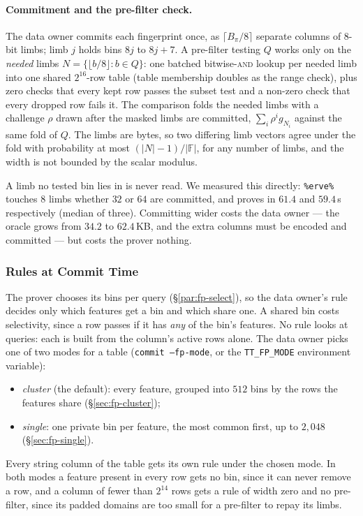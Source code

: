 \paragraph{Commitment and the pre-filter check.}
The data owner commits each fingerprint once, as $\lceil B_\pi / 8
\rceil$ separate columns of $8$-bit limbs; limb $j$ holds bins $8j$ to
$8j + 7$. A pre-filter testing $Q$ works only on the \emph{needed} limbs
$N = \{ \lfloor b/8 \rfloor : b \in Q \}$: one batched
bitwise-\textsc{and} lookup per needed limb into one shared $2^{16}$-row
table (table membership doubles as the range check), plus zero checks
that every kept row passes the subset test and a non-zero check that
every dropped row fails it. The comparison folds the needed limbs with a
challenge $\rho$ drawn after the masked limbs are committed,
$\sum_i \rho^i g_{N_i}$ against the same fold of $Q$. The limbs are
bytes, so two differing limb vectors agree under the fold with
probability at most $(|N| - 1)/|\mathbb{F}|$, for any number of limbs,
and the width is not bounded by the scalar modulus.

A limb no tested bin lies in is never read. We measured this directly:
\texttt{\%erve\%} touches $8$ limbs whether $32$ or $64$ are committed,
and proves in $61.4$ and $59.4$\,s respectively (median of three).
Committing wider costs the data owner --- the oracle grows from $34.2$ to
$62.4$\,KB, and the extra columns must be encoded and committed --- but
costs the prover nothing.

\subsubsection{Rules at Commit Time}
\label{sec:fp-modes}

The prover chooses its bins per query (\S\ref{par:fp-select}), so the
data owner's rule decides only which features get a bin and which share
one. A shared bin costs selectivity, since a row passes if it has
\emph{any} of the bin's features. No rule looks at queries: each is built
from the column's active rows alone. The data owner picks one of two
modes for a table (\texttt{commit --fp-mode}, or the
\texttt{TT\_FP\_MODE} environment variable):
\begin{itemize}
  \item \emph{cluster} (the default): every feature, grouped into $512$
        bins by the rows the features share (\S\ref{sec:fp-cluster});
  \item \emph{single}: one private bin per feature, the most common
        first, up to $2{,}048$ (\S\ref{sec:fp-single}).
\end{itemize}
Every string column of the table gets its own rule under the chosen
mode. In both modes a feature present in every row gets no bin, since it
can never remove a row, and a column of fewer than $2^{14}$ rows gets a
rule of width zero and no pre-filter, since its padded domains are too
small for a pre-filter to repay its limbs.

